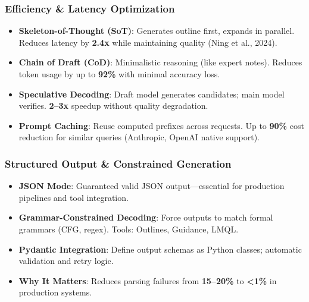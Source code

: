 \documentclass{beamer}
\begin{document}
\begin{frame}
    \frametitle{Efficiency \& Latency Optimization}
    \begin{itemize}
        \item \textbf{Skeleton-of-Thought (SoT)}: Generates outline first, expands in parallel. Reduces latency by \textbf{2.4x} while maintaining quality (Ning et al., 2024).
        \item \textbf{Chain of Draft (CoD)}: Minimalistic reasoning (like expert notes). Reduces token usage by up to \textbf{92\%} with minimal accuracy loss.
        \item \textbf{Speculative Decoding}: Draft model generates candidates; main model verifies. \textbf{2--3x} speedup without quality degradation.
        \item \textbf{Prompt Caching}: Reuse computed prefixes across requests. Up to \textbf{90\%} cost reduction for similar queries (Anthropic, OpenAI native support).
    \end{itemize}
\end{frame}

\begin{frame}
    \frametitle{Structured Output \& Constrained Generation}
    \begin{itemize}
        \item \textbf{JSON Mode}: Guaranteed valid JSON output---essential for production pipelines and tool integration.
        \item \textbf{Grammar-Constrained Decoding}: Force outputs to match formal grammars (CFG, regex). Tools: Outlines, Guidance, LMQL.
        \item \textbf{Pydantic Integration}: Define output schemas as Python classes; automatic validation and retry logic.
        \item \textbf{Why It Matters}: Reduces parsing failures from \textbf{15--20\%} to \textbf{<1\%} in production systems.
    \end{itemize}
\end{frame}
\end{document}
